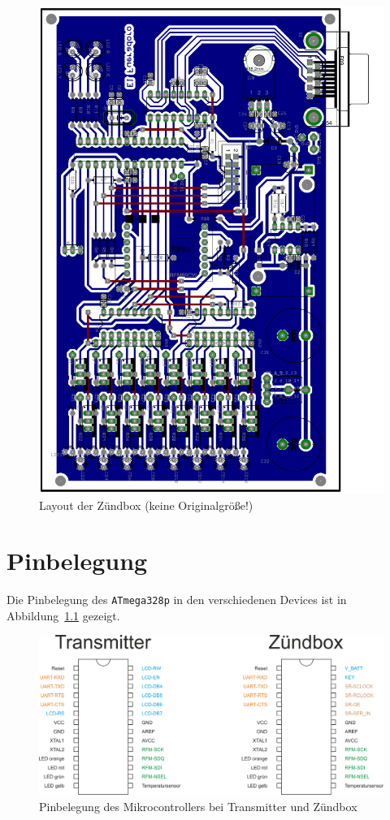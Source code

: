 \documentclass[pdftex, parskip, numbers=noenddot, toc=listof]{scrbook}
\begin{document}
	\begin{figure}
		\centering
		\includegraphics[height=.95\textheight,keepaspectratio]{Bilder/Zuendboxlayout}
		\caption{Layout der Zündbox (keine Originalgröße!)}
		\label{fig:zuendboxlayout}
	\end{figure}

	\chapter{Pinbelegung}
	\label{ch:pinbelegung}

	Die Pinbelegung des \texttt{ATmega328p} in den verschiedenen Devices ist in Abbildung~\ref{fig:pinout} gezeigt.

	\begin{figure}
		\centering
		\includegraphics[width=.7\textwidth]{Bilder/pinout}
		\caption{Pinbelegung des Mikrocontrollers bei Transmitter und Zündbox}
		\label{fig:pinout}
	\end{figure}
\end{document}
